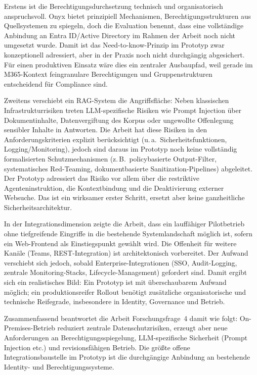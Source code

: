 Erstens ist die Berechtigungsdurchsetzung technisch und organisatorisch anspruchsvoll.
Onyx bietet prinzipiell Mechanismen, Berechtigungsstrukturen aus Quellsystemen zu spiegeln, doch die Evaluation benennt, dass eine vollständige Anbindung an Entra ID/Active Directory im Rahmen der Arbeit noch nicht umgesetzt wurde.
Damit ist das Need-to-know-Prinzip im Prototyp zwar konzeptionell adressiert, aber in der Praxis noch nicht durchgängig abgesichert.
Für einen produktiven Einsatz wäre dies ein zentraler Ausbaupfad, weil gerade im M365-Kontext feingranulare Berechtigungen und Gruppenstrukturen entscheidend für Compliance sind.

Zweitens verschiebt ein RAG-System die Angriffsfläche:
Neben klassischen Infrastrukturrisiken treten LLM-spezifische Risiken wie Prompt Injection über Dokumentinhalte, Datenvergiftung des Korpus oder ungewollte Offenlegung sensibler Inhalte in Antworten.
Die Arbeit hat diese Risiken in den Anforderungskriterien explizit berücksichtigt (u.\,a.\ Sicherheitsfunktionen, Logging/Monitoring), jedoch sind daraus im Prototyp noch keine vollständig formalisierten Schutzmechanismen (z.\,B.\ policybasierte Output-Filter, systematisches Red-Teaming, dokumentbasierte Sanitization-Pipelines) abgeleitet.
Der Prototyp adressiert das Risiko vor allem über die restriktive Agenteninstruktion, die Kontextbindung und die Deaktivierung externer Websuche.
Das ist ein wirksamer erster Schritt, ersetzt aber keine ganzheitliche Sicherheitsarchitektur.

In der Integrationsdimension zeigte die Arbeit, dass ein lauffähiger Pilotbetrieb ohne tiefgreifende Eingriffe in die bestehende Systemlandschaft möglich ist, sofern ein Web-Frontend als Einstiegspunkt gewählt wird.
Die Offenheit für weitere Kanäle (Teams, REST-Integration) ist architektonisch vorbereitet.
Der Aufwand verschiebt sich jedoch, sobald Enterprise-Integrationen (SSO, Audit-Logging, zentrale Monitoring-Stacks, Lifecycle-Management) gefordert sind.
Damit ergibt sich ein realistisches Bild: Ein Prototyp ist mit überschaubarem Aufwand möglich; ein produktionsreifer Rollout benötigt zusätzliche organisatorische und technische Reifegrade, insbesondere in Identity, Governance und Betrieb.

Zusammenfassend beantwortet die Arbeit Forschungsfrage~4 damit wie folgt:
On-Premises-Betrieb reduziert zentrale Datenschutzrisiken, erzeugt aber neue Anforderungen an Berechtigungsspiegelung, LLM-spezifische Sicherheit (Prompt Injection etc.) und revisionsfähigen Betrieb.
Die größte offene Integrationsbaustelle im Prototyp ist die durchgängige Anbindung an bestehende Identity- und Berechtigungssysteme.

